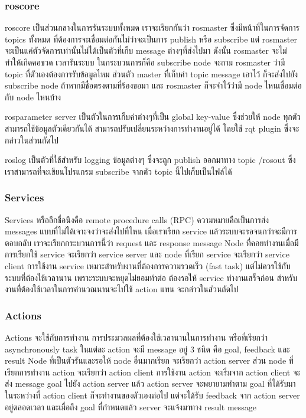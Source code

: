 \subsubsection*{roscore}
roscore เป็นส่วนกลางในการรันระบบทั้งหมด เราจะเรียกกันว่า rosmaster ซึ่งมีหน้าที่ในการจัดการ
topics ทั้งหมด ที่ต้องการจะเชื่อมต่อกันไม่ว่าจะเป็นการ publish หรือ subscribe แต่ rosmaster
จะเป็นแค่ตัวจัดการเท่านั้นไม่ได้เป็นตัวที่เก็บ message ต่างๆที่ส่งไปมา ดังนั้น rosmaster จะไม่ทำให้เกิดคอขวด เวลารันระบบ
ในกระบวนการก็คือ subscribe node จะถาม rosmaster ว่ามี topic ที่ตัวเองต้องการรับข้อมูลไหม
ส่วนตัว master ที่เก็บค่า topic message เอาไว้ ก็จะส่งไปยัง subscribe node ถ้าหากมีชื่อตรงตามที่ร้องขอมา
และ rosmaster ก็จะจำไว้ว่ามี node ไหนเชื่อมต่อกับ node ไหนบ้าง

rosparameter server เป็นตัวในการเก็บค่าต่างๆที่เป็น global key-value ซึ่งช่วยให้ node ทุกตัวสามารถใช้ข้อมูลตัวเดียวกันได้
สามารถปรับเปลี่ยนระหว่างการทำงานอยู่ได้ โดยใช้ rqt plugin ซึ่งจะกล่าวในส่วนถัดไป

roslog เป็นตัวที่ใช้สำหรับ logging ข้อมูลต่างๆ ซึ่งจะถูก publish ออกมาทาง topic /rosout ซึ่งเราสามารถที่จะเขียนโปรแกรม
subscribe จากตัว topic นี้ไปเก็บเป็นไฟล์ได้

\subsubsection*{Services}
Services หรืออีกชื่อนึงคือ remote procedure calls (RPC) ความหมายคือเป็นการส่ง messages แบบที่ไม่ได้เจาะจงว่าจะส่งไปที่ไหน
เมื่อเราเรียก service แล้วระบบจะรอจนกว่าจะมีการตอบกลับ เราจะเรียกกระบวนการนี้ว่า request และ response message
Node ที่คอยทำงานเมื่อมีการเรียกใช้ service จะเรียกว่า service server และ node ที่เรียก service จะเรียกว่า service client
การใช้งาน service เหมาะสำหรับงานที่ต้องการความรวดเร็ว (fast task) แต่ไม่ควรใช้กับระบบที่ต้องใช้เวลานาน
เพราะระบบจะหยุดไม่ยอมทำต่อ ต้องรอให้ service ทำงานเสร็จก่อน สำหรับงานที่ต้องใช้เวลาในการคำนวณนานจะไปใช้ action
แทน จะกล่าวในส่วนถัดไป 

\subsubsection*{Actions}
Actions จะใช้กับการทำงาน การประมวลผลที่ต้องใช้เวลานานในการทำงาน หรือที่เรียกว่า asynchronously task
ในแต่ละ action จะมี message อยู่ 3 ชนิด คือ goal, feedback และ result Node ที่เป็นตัวรันและรอให้ node อื่นมากเรียก
จะเรียกว่า action server ส่วน node ที่เรียกการทำงาน action จะเรียกว่า action client การใช้งาน action จะเริ่มจาก
action client จะส่ง message goal ไปยัง action server แล้ว action server จะพยายามทำตาม goal ที่ได้รับมา ในระหว่างที่
action client ก็จะทำงานของตัวเองต่อไป แต่จะได้รับ feedback จาก action server อยู่ตลอดเวลา และเมื่อถึง goal ที่กำหนดแล้ว
server จะแจ้งมาทาง result message

